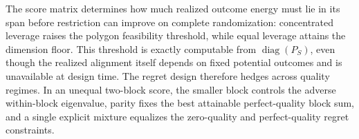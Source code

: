 The score matrix determines how much realized outcome energy must lie in its span before restriction can improve on complete randomization: concentrated leverage raises the polygon feasibility threshold, while equal leverage attains the dimension floor.  This threshold is exactly computable from \(\operatorname{diag}(P_S)\), even though the realized alignment itself depends on fixed potential outcomes and is unavailable at design time.  The regret design therefore hedges across quality regimes.  In an unequal two-block score, the smaller block controls the adverse within-block eigenvalue, parity fixes the best attainable perfect-quality block sum, and a single explicit mixture equalizes the zero-quality and perfect-quality regret constraints.